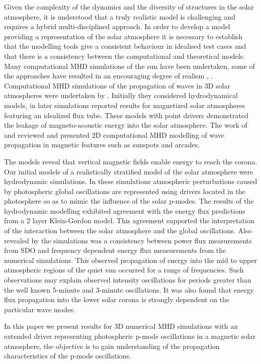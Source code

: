 \documentclass[linenumbers]{aastex63}
\begin{document}
Given the complexity of the dynamics and the diversity of structures in the solar atmosphere, it is understood that a truly realistic model is challenging and requires a hybrid multi-disciplined approach. In order to develop a model providing a representation of the solar atmosphere it is necessary to establish that the modelling tools give a consistent behaviour in idealised test cases and that there is a consistency between the computational and theoretical models. Many computational MHD simulations of the sun have been undertaken, some of the approaches have resulted in an encouraging degree of realism  \citet{Vogler2005}, \citet{Gudiksen2011}. Computational MHD simulations of the propagation of waves in 3D solar atmospheres were undertaken by \citet{Fedun2009a}. Initially they considered hydrodynamical models, in later simulations \citet{Fedun2009b} \citet{Vigeesh2012} reported results for magnetized solar atmospheres featuring an idealized flux tube. These models with point drivers demonstrated the leakage of magneto-acoustic energy into the solar atmosphere. The work of \citet{Khomenko2013} and  \citet{Santamaria2015} reviewed and presented 2D computational MHD modelling of wave propagation in magnetic features such as sunspots and arcades. 

 
The models reveal that vertical magnetic fields enable energy to reach the corona. Our initial models of a realistically stratified model of the solar atmosphere \citet{Griffiths2018b} were hydrodynamic simulations. In these simulations atmospheric perturbations caused by photospheric global oscillations are represented using drivers located in the photosphere so as to mimic the influence of the solar p-modes. The results of the hydrodynamic modelling exhibited agreement  with the energy flux predictions from a 2 layer Klein-Gordon model. This agreement supported the interpretation of the interaction between the solar atmosphere and the global oscillations. Also revealed by the simulations  was a consistency between power flux measurements from SDO and frequency dependent energy flux measurements from the numerical simulations. This observed propagation of energy into the mid to upper atmospheric regions of the quiet sun occurred for a range of frequencies. Such observations may explain observed intensity oscillations for periods greater than the well known 5-minute and 3-minute oscillations. It was also found that energy flux propagation into the lower solar corona is strongly dependent on the particular wave modes. 


In this paper we present results for 3D numerical MHD simulations with an extended driver representing photospheric p-mode oscillations in a magnetic solar atmosphere, the objective is to gain understanding of the propagation characteristics of the p-mode oscillations. 
\end{document}
